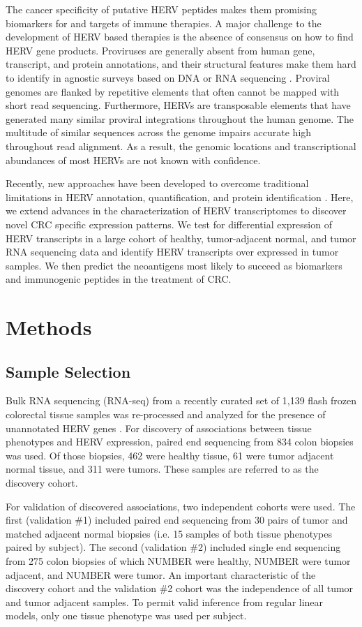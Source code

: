 \documentclass[11pt,letterpaper]{article}
\begin{document}
The cancer specificity of putative HERV peptides makes them promising biomarkers for and targets of immune therapies.
A major challenge to the development of HERV based therapies is the absence of consensus on how to find HERV gene products.
Proviruses are generally absent from human gene, transcript, and protein annotations, and their structural features make them hard to identify in agnostic surveys based on DNA or RNA sequencing \citep{ERVmap2018, Treangen2011}.
Proviral genomes are flanked by repetitive elements that often cannot be mapped with short read sequencing.
Furthermore, HERVs are transposable elements that have generated many similar proviral integrations throughout the human genome.
The multitude of similar sequences across the genome impairs accurate high throughout read alignment.
As a result, the genomic locations and transcriptional abundances of most HERVs are not known with confidence.

Recently, new approaches have been developed to overcome traditional limitations in HERV annotation, quantification, and protein identification \citep{Attig2017, Attig2019, ERVmap2018, Telescope2019}.
Here, we extend advances in the characterization of HERV transcriptomes to discover novel CRC specific expression patterns.
We test for differential expression of HERV transcripts in a large cohort of healthy, tumor-adjacent normal, and tumor RNA sequencing data and identify HERV transcripts over expressed in tumor samples.
We then predict the neoantigens most likely to succeed as biomarkers and immunogenic peptides in the treatment of CRC.

\section*{Methods}
\subsection*{Sample Selection}
Bulk RNA sequencing (RNA-seq) from a recently curated set of 1,139 flash frozen colorectal tissue samples was re-processed and analyzed for the presence of unannotated HERV genes \citep{Dampier2020}.
For discovery of associations between tissue phenotypes and HERV expression, paired end sequencing from 834 colon biopsies was used.
Of those biopsies, 462 were healthy tissue, 61 were tumor adjacent normal tissue, and 311 were tumors.
These samples are referred to as the discovery cohort.

For validation of discovered associations, two independent cohorts were used.
The first (validation \#1) included paired end sequencing from 30 pairs of tumor and matched adjacent normal biopsies (i.e. 15 samples of both tissue phenotypes paired by subject).
The second (validation \#2) included single end sequencing from 275 colon biopsies of which NUMBER were healthy, NUMBER were tumor adjacent, and NUMBER were tumor.
An important characteristic of the discovery cohort and the validation \#2 cohort was the independence of all tumor and tumor adjacent samples.
To permit valid inference from regular linear models, only one tissue phenotype was used per subject.
\end{document}
